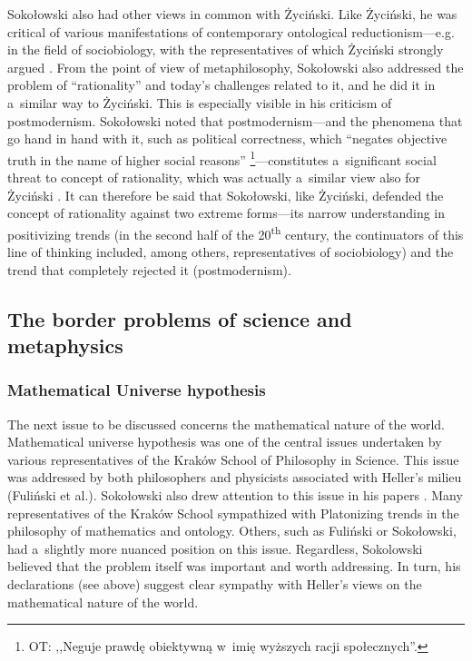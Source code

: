 Sokołowski also had other views in common with Życiński. Like Życiński, he was critical of various manifestations of contemporary ontological reductionism---e.g. in the field of sociobiology, with the representatives of which Życiński strongly argued 
\parencites[][p.219]{}[][pp.243–268]{}. %
 From the point of view of metaphilosophy, Sokołowski also addressed the problem of ``rationality'' and today's challenges related to it, and he did it in a~similar way to Życiński. This is especially visible in his criticism of postmodernism. Sokołowski noted that postmodernism---and the phenomena that go hand in hand with it, such as political correctness, which ``negates objective truth in the name of higher social reasons'' 
\parencite[][p.379]{}%
\footnote{OT: ,,Neguje prawdę obiektywną w~imię wyższych racji społecznych''.}---constitutes a~significant social threat to concept of rationality, which was actually a~similar view also for Życiński 
\parencite[][]{}. %
 It can therefore be said that Sokołowski, like Życiński, defended the concept of rationality against two extreme forms---its narrow understanding in positivizing trends (in the second half of the 20\textsuperscript{th} century, the continuators of this line of thinking included, among others, representatives of sociobiology) and the trend that completely rejected it (postmodernism).



\subsection{ The border problems of science and metaphysics}



\subsubsection{Mathematical Universe hypothesis }



The next issue to be discussed concerns the mathematical nature of the world. Mathematical universe hypothesis was one of the central issues undertaken by various representatives of the Kraków School of Philosophy in Science. This issue was addressed by both philosophers and physicists associated with Heller's milieu (Fuliński et al.). Sokołowski also drew attention to this issue in his papers 
\parencites[see e.g,][]{}[][]{}[][]{}[][]{}. %
 Many representatives of the Kraków School sympathized with Platonizing trends in the philosophy of mathematics and ontology. Others, such as Fuliński or Sokołowski, had a~slightly more nuanced position on this issue. Regardless, Sokolowski believed that the problem itself was important and worth addressing. In turn, his declarations (see above) suggest clear sympathy with Heller's views on the mathematical nature of the world.



